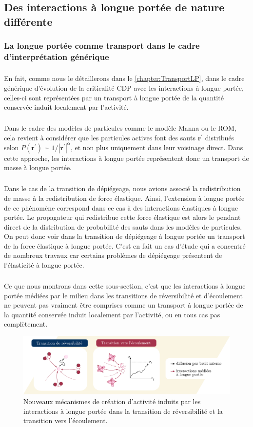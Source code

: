 \subsection{Des interactions à longue portée de nature différente}

\subsubsection{La longue portée comme transport dans le cadre d'interprétation générique}

\subparagraph{}En fait, comme nous le détaillerons dans le \autoref{chapter:TransportLP}, dans le cadre générique d'évolution de la criticalité CDP avec les interactions à longue portée, celles-ci sont représentées par un transport à longue portée de la quantité conservée induit localement par l'activité.

\subparagraph{}Dans le cadre des modèles de particules comme le modèle Manna ou le ROM, cela revient à considérer que les particules actives font des sauts $\mathbf{r}^\prime$ distribués selon $P(\mathbf{r}^\prime)\sim 1/|\mathbf{r}^{\prime}|^{\alpha}$, et non plus uniquement dans leur voisinage direct. Dans cette approche, les interactions à longue portée représentent donc un transport de masse à longue portée.

\subparagraph{}Dans le cas de la transition de dépiégeage, nous avions associé la redistribution de masse à la redistribution de force élastique. Ainsi, l'extension à longue portée de ce phénomène correspond dans ce cas à des interactions élastiques à longue portée. Le propagateur qui redistribue cette force élastique est alors le pendant direct de la distribution de probabilité des sauts dans les modèles de particules. On peut donc voir dans la transition de dépiégeage à longue portée un transport de la force élastique à longue portée. C'est en fait un cas d'étude qui a concentré de nombreux travaux car certains problèmes de dépiégeage présentent de l'élasticité à longue portée.


\subparagraph{}Ce que nous montrons dans cette sous-section, c'est que les interactions à longue portée médiées par le milieu dans les transitions de réversibilité et d'écoulement ne peuvent pas vraiment être comprises comme un transport à longue portée de la quantité conservée induit localement par l'activité, ou en tous cas pas complètement.

\begin{figure}[h]
	\centering
	\includegraphics[width=\textwidth]{Chapitre1/Figures/Pb/bruit.pdf}
	\caption{Nouveaux mécanismes de création d'activité induits par les interactions à longue portée dans la transition de réversibilité et la transition vers l'écoulement. }
	\label{fig:bruit}
\end{figure}

